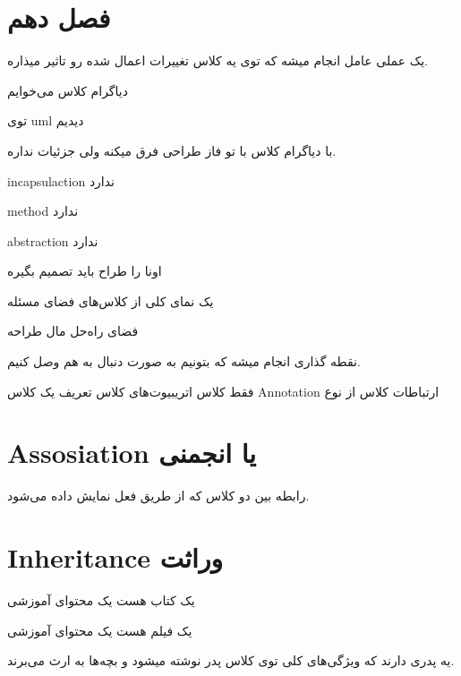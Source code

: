 \newpage

\section{فصل دهم}































یک عملی عامل انجام میشه که توی یه کلاس تغییرات اعمال شده رو تاثیر میذاره.

دیاگرام کلاس می‌خوایم

توی uml دیدیم

با دیاگرام کلاس با تو فاز طراحی فرق میکنه ولی جزئیات نداره.

incapsulaction ندارد

method ندارد

abstraction ندارد

اونا را طراح باید تصمیم بگیره

یک نمای کلی از کلاس‌های فضای مسئله

فضای راه‌حل مال طراحه

نقطه گذاری انجام میشه که بتونیم به صورت دنبال به هم وصل کنیم.

فقط کلاس
اتریبیوت‌های کلاس
تعریف یک کلاس Annotation
ارتباطات کلاس از نوع

\section{Assosiation یا انجمنی}

رابطه بین دو کلاس که از طریق فعل نمایش داده می‌شود.

\section{Inheritance وراثت}

یک کتاب هست یک محتوای آموزشی

یک فیلم هست یک محتوای آموزشی

یه پدری دارند که ویژگی‌های کلی توی کلاس پدر نوشته میشود و بچه‌ها به ارث می‌برند.

